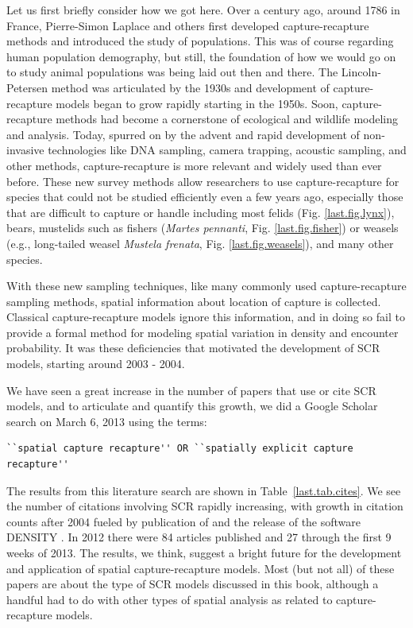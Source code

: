 Let us first briefly consider how we got here. Over a century ago,
around 1786 in France, Pierre-Simon Laplace and others first developed
capture-recapture methods and introduced the study of populations.
This was of course regarding
human population demography, but still, the foundation of how we would
go on to study animal populations was being laid out then and there.
The Lincoln-Petersen method was articulated by the 1930s and
development of capture-recapture models began to grow rapidly starting
in the 1950s.  Soon, capture-recapture methods had become a
cornerstone of ecological and wildlife modeling and analysis. Today,
spurred on by the advent and rapid development of non-invasive
technologies like DNA sampling, camera trapping, acoustic sampling,
and other methods, capture-recapture is more relevant and widely used
than ever before. These new survey methods allow researchers to use
capture-recapture for species that could not be studied efficiently
even a few years ago, especially those that are difficult to capture
or handle including most felids (Fig. \ref{last.fig.lynx}), bears,
mustelids such as fishers ({\it Martes pennanti},
Fig. \ref{last.fig.fisher}) or weasels (e.g., long-tailed weasel {\it
  Mustela frenata}, Fig. \ref{last.fig.weasels}), and many other
species.

With these new sampling techniques, like many commonly used
capture-recapture sampling methods, spatial information about location
of capture is collected.  Classical capture-recapture models ignore
this information, and in doing so fail to provide a formal method for
modeling spatial variation in density and encounter probability.  It
was these deficiencies that motivated the development of SCR models,
starting around 2003 - 2004.

We have seen a great increase in the number of papers that use or cite
SCR models, and to articulate and quantify this growth, we did a
Google Scholar search on March 6, 2013 using the terms:
\begin{small}
\begin{verbatim}
``spatial capture recapture'' OR ``spatially explicit capture recapture''
\end{verbatim}
\end{small}
The results from this literature search are shown in
Table~\ref{last.tab.cites}.  We see the number of citations involving
SCR rapidly increasing, with growth in citation counts after 2004
fueled by publication of \citet{efford:2004} and the release of the
software DENSITY \citep{efford_etal:2004}. In 2012 there were 84
articles published and 27 through the first 9 weeks of 2013.  The
results, we think, suggest a bright future for the development and
application of spatial capture-recapture models. Most (but not all) of
these papers are about the type of SCR models discussed in this book,
although a handful had to do with other types of spatial analysis as
related to capture-recapture models.

